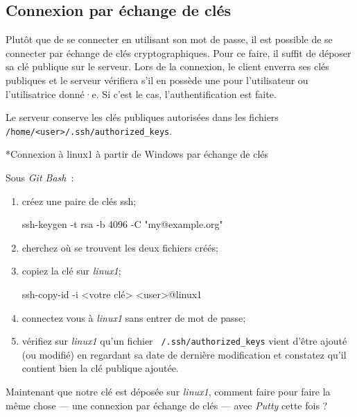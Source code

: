\documentclass[a4paper,11pt]{article}
\begin{document}
\subsection{Connexion par échange de clés}

Plutôt que de se connecter en utilisant son mot de passe, il est possible de se
connecter par échange de clés cryptographiques. Pour ce faire, il suffit de
déposer sa clé publique sur le serveur. Lors de la connexion, le client enverra
ses clés publiques et le serveur vérifiera s'il en possède une pour
l'utilisateur ou l'utilisatrice donné·e. Si c'est le cas, l'authentification est
faite. 

Le serveur conserve les clés publiques autorisées dans les fichiers 
\\\texttt{/home/<user>/.ssh/authorized\_keys}.

\begin{Exercice}*{Connexion à linux1 à partir de Windows par échange de clés}

	Sous \textit{Git Bash}~:

	\begin{enumerate}
		\item créez une paire de clés ssh;
			\begin{term}
				ssh-keygen -t rsa -b 4096 -C "my@example.org"
			\end{term}

		\item cherchez où se trouvent les deux fichiers créés;
		\item copiez la clé sur \textit{linux1};
			\begin{term}
				ssh-copy-id -i <votre clé> <user>@linux1
			\end{term}

		\item connectez vous à \textit{linux1} sans entrer de mot de passe;
		
		\item vérifiez sur \textit{linux1} qu'un fichier
			\texttt{~/.ssh/authorized\_keys} vient d'être ajouté (ou modifié) en
			regardant sa date de dernière modification et constatez qu'il contient
			bien la clé publique ajoutée.	
	\end{enumerate}

	Maintenant que notre clé est déposée sur \textit{linux1}, comment faire pour
	faire la même chose — une connexion par échange de clés — avec
	\textit{Putty} cette fois ?

\end{Exercice}
\end{document}
